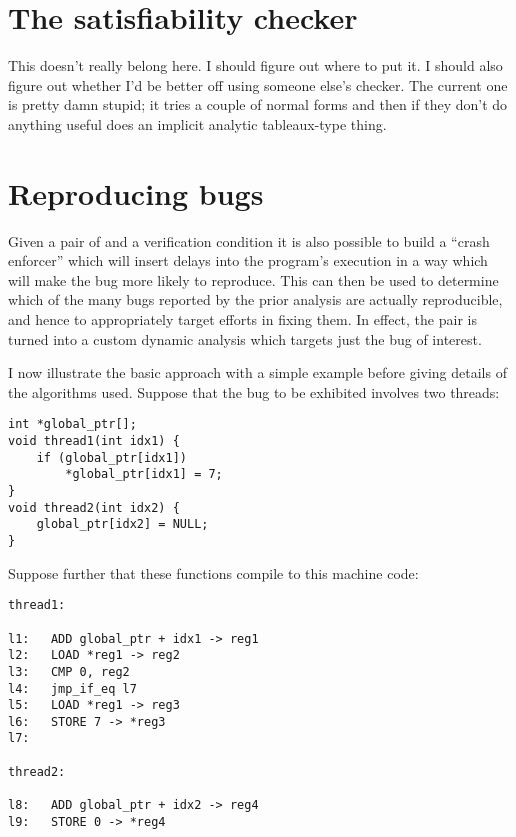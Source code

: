 \section{The satisfiability checker}
This doesn't really belong here.  I should figure out where to put it.
I should also figure out whether I'd be better off using someone
else's checker.  The current one is pretty damn stupid; it tries a
couple of normal forms and then if they don't do anything useful does
an implicit analytic tableaux-type thing.

\section{Reproducing bugs}
\label{sect:reproducing_bugs}



Given a pair of {\StateMachines} and a verification condition it is
also possible to build a ``crash enforcer'' which will insert delays
into the program's execution in a way which will make the bug more
likely to reproduce.  This can then be used to determine which of the
many bugs reported by the prior analysis are actually reproducible,
and hence to appropriately target efforts in fixing them.  In effect,
the {\StateMachine} pair is turned into a custom dynamic analysis
which targets just the bug of interest.

I now illustrate the basic approach with a simple example before
giving details of the algorithms used.  Suppose that the bug to be
exhibited involves two threads:

\begin{verbatim}
int *global_ptr[];
void thread1(int idx1) {
    if (global_ptr[idx1])
        *global_ptr[idx1] = 7;
} 
void thread2(int idx2) {
    global_ptr[idx2] = NULL;
}
\end{verbatim}

Suppose further that these functions compile to this machine code:

\begin{verbatim}
thread1:

l1:   ADD global_ptr + idx1 -> reg1
l2:   LOAD *reg1 -> reg2
l3:   CMP 0, reg2
l4:   jmp_if_eq l7
l5:   LOAD *reg1 -> reg3
l6:   STORE 7 -> *reg3
l7:

thread2:

l8:   ADD global_ptr + idx2 -> reg4
l9:   STORE 0 -> *reg4
\end{verbatim}

